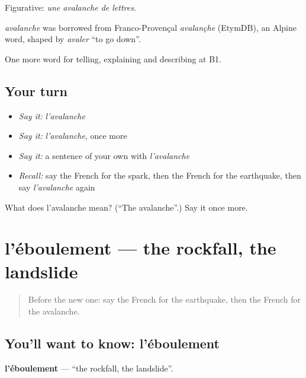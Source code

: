 Figurative: \emph{une avalanche de lettres}.

\begin{cousinweb}
\emph{avalanche} was borrowed from Franco-Provençal \emph{avalançhe} (EtymDB), an Alpine word, shaped by \emph{avaler} \textquotedblleft{}to go down\textquotedblright{}.
\end{cousinweb}

\begin{grammarlens}[title={What you've built}]
One more word for telling, explaining and describing at B1.
\end{grammarlens}

\subsection*{Your turn}
\begin{itemize}
\raggedright
  \item \emph{Say it:} \emph{l'avalanche}
  \item \emph{Say it:} \emph{l'avalanche}, once more
  \item \emph{Say it:} a sentence of your own with \emph{l'avalanche}
  \item \emph{Recall:} say the French for the spark, then the French for the earthquake, then say \emph{l'avalanche} again
\end{itemize}

\begin{tcolorbox}[breakable,colback=teal!4,colframe=teal!35!black,title={Before you move on}]
What does l'avalanche mean? (\textquotedblleft{}The avalanche\textquotedblright{}.) Say it once more.
\end{tcolorbox}
\section[l'éboulement]{l'éboulement — the rockfall, the landslide}

\label{lesson:FR-C303-eboulement}



\begin{quote}
Before the new one: say the French for the earthquake, then the French for the avalanche.
\end{quote}

\subsection*{You'll want to know: l'éboulement}
\textbf{l'éboulement} — \textquotedblleft{}the rockfall, the landslide\textquotedblright{}.

